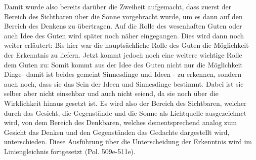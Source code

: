 Damit wurde also bereits darüber die Zweiheit aufgemacht, dass zuerst der Bereich des Sichtbaren über die Sonne vorgebracht wurde, um es dann auf den Bereich des Denkens zu übertragen.  
Auf die Rolle des wesenhaften Guten oder auch Idee des Guten wird später noch näher eingegangen. 
Dies wird dann noch weiter erläutert:
Bis hier war die hauptsächliche Rolle des Guten die Möglichkeit der Erkenntnis zu liefern. Jetzt kommt jedoch noch eine weitere wichtige Rolle dem Guten zu:
Somit kommt aus der Idee des Guten nicht nur die Möglichkeit Dinge- damit ist beides gemeint Sinnesdinge und Ideen - zu erkennen, sondern auch noch, dass sie das Sein der Ideen und Sinnesdinge bestimmt. Dabei ist sie selber aber nicht einsehbar und auch nicht seiend, da sie noch über die Wirklichkeit hinaus gesetzt ist. 
Es wird also der Bereich des Sichtbaren, welcher durch das Gesicht, die Gegenstände und die Sonne als Lichtquelle ausgezeichnet wird, von dem Bereich des Denkbaren, welches dementsprechend analog zum Gesicht das Denken und den Gegenständen das Gedachte dargestellt wird, unterschieden. 
Diese Ausführung über die Unterscheidung der Erkenntnis wird im Liniengleichnis fortgesetzt (Pol. 509e-511e).
